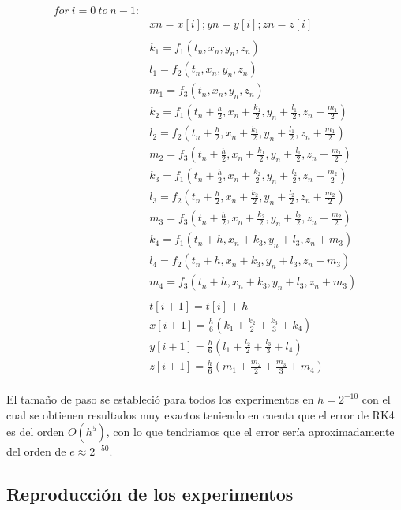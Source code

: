 \documentclass{wscpaperproc}
\theoremstyle{wsc}
\begin{document}
\doublespacing
\begin{equation*}
	\begin{split}
		for\ i=0\ to\ n - 1:\\
		&xn = x[i];yn = y[i];zn = z[i]\\
		\\
		&k_1 = f_1(t_n, x_n, y_n, z_n)\\
		&l_1 = f_2(t_n, x_n, y_n, z_n)\\
		&m_1 = f_3(t_n, x_n, y_n, z_n)\\
		&k_2 = f_1(t_n + \frac{h}{2}, x_n + \frac{k_1}{2}, y_n + \frac{l_1}{2}, z_n + \frac{m_1}{2})\\
		&l_2 = f_2(t_n + \frac{h}{2}, x_n + \frac{k_1}{2}, y_n + \frac{l_1}{2}, z_n + \frac{m_1}{2})\\
		&m_2 = f_3(t_n + \frac{h}{2}, x_n + \frac{k_1}{2}, y_n + \frac{l_1}{2}, z_n + \frac{m_1}{2})\\
		&k_3 = f_1(t_n + \frac{h}{2}, x_n + \frac{k_2}{2}, y_n + \frac{l_2}{2}, z_n + \frac{m_2}{2})\\
		&l_3 = f_2(t_n + \frac{h}{2}, x_n + \frac{k_2}{2}, y_n + \frac{l_2}{2}, z_n + \frac{m_2}{2})\\
		&m_3 = f_3(t_n + \frac{h}{2}, x_n + \frac{k_2}{2}, y_n + \frac{l_2}{2}, z_n + \frac{m_2}{2})\\
		&k_4 = f_1(t_n + h, x_n + k_3, y_n + l_3, z_n + m_3)\\
		&l_4 = f_2(t_n + h, x_n + k_3, y_n + l_3, z_n + m_3)\\
		&m_4 = f_3(t_n + h, x_n + k_3, y_n + l_3, z_n + m_3)\\
		\\
		&t[i+1] = t[i] + h\\
		&x[i+1] = \frac{h}{6}(k_1 + \frac{k_2}{2} + \frac{k_3}{3} + k_4)\\
		&y[i+1] = \frac{h}{6}(l_1 + \frac{l_2}{2} + \frac{l_3}{3} + l_4)\\
		&z[i+1] = \frac{h}{6}(m_1 + \frac{m_2}{2} + \frac{m_3}{3} + m_4)\\
	\end{split}
\end{equation*}
\singlespacing

El tamaño de paso se estableció para todos los experimentos en
$h=2^{-10}$ con el cual se obtienen resultados muy exactos teniendo
en cuenta que el error de RK4 es del orden $O(h^5)$, con lo que tendriamos
que el error sería aproximadamente del orden de $e \approx 2^{-50}$.

\subsection*{Reproducción de los experimentos}
\end{document}
